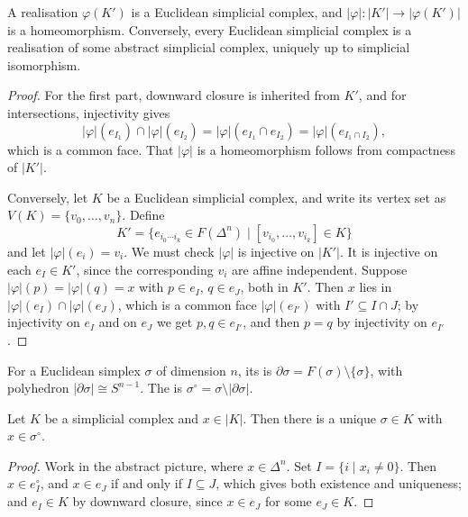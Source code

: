 \documentclass[a4paper]{scrartcl}
\begin{document}
\begin{proposition} \label{prop:realisation}
	A realisation $\varphi(K')$ is a Euclidean simplicial complex, and $|\varphi|: |K'| \to |\varphi(K')|$ is a homeomorphism. Conversely, every Euclidean simplicial complex is a realisation of some abstract simplicial complex, uniquely up to simplicial isomorphism.
\end{proposition}
\begin{proof}
	For the first part, downward closure is inherited from $K'$, and for intersections, injectivity gives
	$$
	|\varphi|(e_{I_1}) \cap |\varphi|(e_{I_2}) = |\varphi|(e_{I_1}\cap e_{I_2}) = |\varphi|(e_{I_1\cap I_2}),
	$$
	which is a common face. That $|\varphi|$ is a homeomorphism follows from compactness of $|K'|$.

	Conversely, let $K$ be a Euclidean simplicial complex, and write its vertex set as $V(K) = \{v_0,\dots,v_n\}$. Define
	$$
	K' = \{e_{i_0\cdots i_k} \in F(\Delta^n) \mid [v_{i_0},\dots,v_{i_k}] \in K\}
	$$
	and let $|\varphi|(e_i) = v_i$. We must check $|\varphi|$ is injective on $|K'|$. It is injective on each $e_I \in K'$, since the corresponding $v_i$ are affine independent. Suppose $|\varphi|(p) = |\varphi|(q) = x$ with $p \in e_I$, $q \in e_J$, both in $K'$. Then $x$ lies in $|\varphi|(e_I)\cap|\varphi|(e_J)$, which is a common face $|\varphi|(e_{I'})$ with $I' \subseteq I \cap J$; by injectivity on $e_I$ and on $e_J$ we get $p, q \in e_{I'}$, and then $p = q$ by injectivity on $e_{I'}$.
\end{proof}

\begin{definition}
	For a Euclidean simplex $\sigma$ of dimension $n$, its  is $\partial\sigma = F(\sigma)\setminus\{\sigma\}$, with polyhedron $|\partial\sigma| \cong S^{n-1}$. The  is $\sigma^\circ = \sigma \setminus |\partial\sigma|$.
\end{definition}

\begin{lemma} \label{lem:unique-open-simplex}
	Let $K$ be a simplicial complex and $x \in |K|$. Then there is a unique $\sigma \in K$ with $x \in \sigma^\circ$.
\end{lemma}
\begin{proof}
	Work in the abstract picture, where $x \in \Delta^n$. Set $I = \{i \mid x_i \neq 0\}$. Then $x \in e_I^\circ$, and $x \in e_J$ if and only if $I \subseteq J$, which gives both existence and uniqueness; and $e_I \in K$ by downward closure, since $x \in e_J$ for some $e_J \in K$.
\end{proof}
\end{document}
